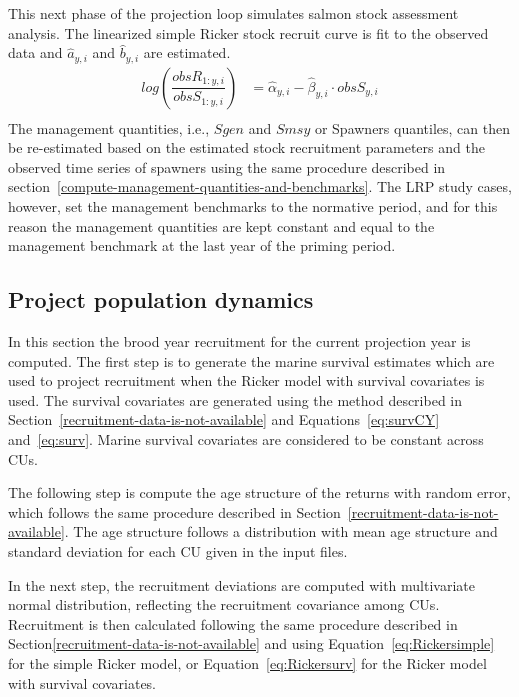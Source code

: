 \documentclass[11pt]{book}
\begin{document}
This next phase of the projection loop simulates salmon stock assessment analysis. The linearized simple Ricker stock recruit curve is fit to the observed data and \(\hat{a}_{y,i}\) and \(\hat{b}_{y,i}\) are estimated.
\begin{align}
  log \left( \dfrac{obsR_{1:y,i}}{obsS_{1:y,i}}\right) &= \hat{\alpha}_{y,i}-\hat{\beta}_{y,i} \cdot  obsS_{y,i}\\
  \label{eq:obslogRS}
\end{align}
The management quantities, i.e., \(Sgen\) and \(Smsy\) or Spawners quantiles, can then be re-estimated based on the estimated stock recruitment parameters and the observed time series of spawners using the same procedure described in section~\ref{compute-management-quantities-and-benchmarks}. The LRP study cases, however, set the management benchmarks to the normative period, and for this reason the management quantities are kept constant and equal to the management benchmark at the last year of the priming period.

\hypertarget{project-population-dynamics}{%
\subsection{Project population dynamics}\label{project-population-dynamics}}

In this section the brood year recruitment for the current projection year is computed. The first step is to generate the marine survival estimates which are used to project recruitment when the Ricker model with survival covariates is used. The survival covariates are generated using the method described in Section~\ref{recruitment-data-is-not-available} and Equations~\ref{eq:survCY} and~\ref{eq:surv}. Marine survival covariates are considered to be constant across CUs.

The following step is compute the age structure of the returns with random error, which follows the same procedure described in Section~\ref{recruitment-data-is-not-available}. The age structure follows a distribution with mean age structure and standard deviation for each CU given in the input files.

In the next step, the recruitment deviations are computed with multivariate normal distribution, reflecting the recruitment covariance among CUs. Recruitment is then calculated following the same procedure described in Section\ref{recruitment-data-is-not-available} and using Equation~\ref{eq:Rickersimple} for the simple Ricker model, or Equation~\ref{eq:Rickersurv} for the Ricker model with survival covariates.
\end{document}
